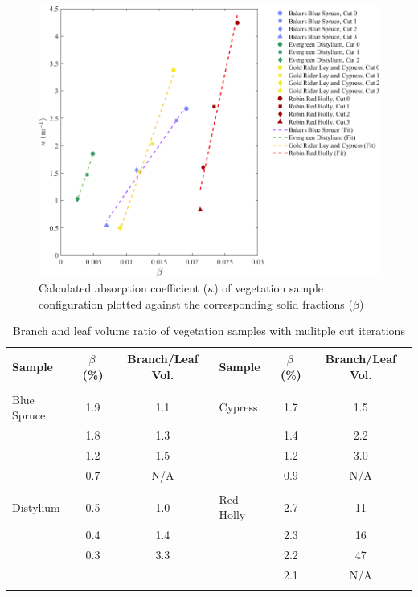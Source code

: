 \documentclass[12pt]{article}
\begin{document}
\begin{figure}[!h]
	\centering
    \includegraphics[width=1\linewidth]{Picture12.png}
	\caption[Comparison of absorption coefficient, $\kappa$, and solid fraction, $\beta$]{Calculated absorption coefficient ($\kappa$) of vegetation sample configuration plotted against the corresponding solid fractions ($\beta$)}
	\label{fig:betavkappa}
\end{figure}



\begin{table}[!h]
\caption[Branch and leaf volume ratio of vegetation samples]{Branch and leaf volume ratio of vegetation samples with mulitple cut iterations}
\label{tab:RatioTable}
\centering

	\begin{tabular*}{\textwidth}{lcclcc}
			\hline
\rule{0pt}{14pt}\textbf{Sample}	&\textbf{$\beta$\,(\%)}	& {\bf Branch/Leaf Vol.}  \hspace{.2in}  		&\textbf{Sample}		&	\textbf{$\beta$\,(\%)}	& {\bf Branch/Leaf Vol.}	\\
\hline
\\[0.01cm]
Blue Spruce		    		&	1.9			& 	1.1			        				& Cypress       		&	1.7		&	1.5						\\
					&	1.8			& 	1.3							&				&	1.4		&	2.2						\\
					&	1.2			& 	1.5							&				&	1.2		&	3.0						\\
					&	0.7			&	N/A							&				&	0.9		&  	N/A 						\\
					&				&								&				&			&       							\\
Distylium				&	0.5			&	1.0							& Red Holly	     		&	2.7		&	11						\\
					&	0.4			&	1.4							&				&	2.3		&	16						\\
					&	0.3			&	3.3							&				&	2.2		&	47						\\
					&				&								&				&	2.1		&        N/A 						\\
\\[0.005cm]
\hline

\end{tabular*}
\end{table}
\end{document}
